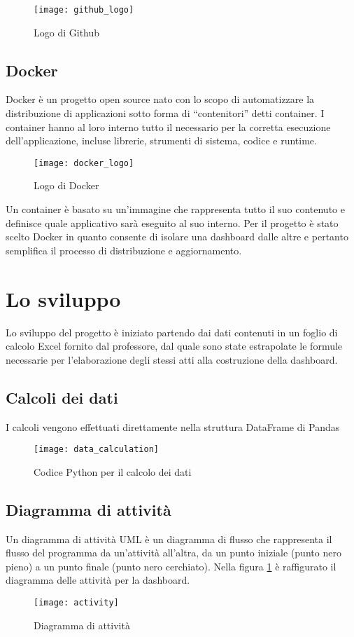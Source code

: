 \begin{figure}[htp]
    \centering
    \texttt{[image: github\_logo]}
    \caption{Logo di Github}
\end{figure}

\subsection{Docker}
\noindent Docker è un progetto open source nato con lo scopo di automatizzare la distribuzione di applicazioni sotto forma di “contenitori” detti container.
I container hanno al loro interno tutto il necessario per la corretta esecuzione dell’applicazione, incluse librerie, strumenti di sistema, codice e runtime.

\begin{figure}[htp]
    \centering
    \texttt{[image: docker\_logo]}
    \caption{Logo di Docker}
\end{figure}

\noindent Un container è basato su un’immagine che rappresenta tutto il suo contenuto e definisce quale applicativo sarà eseguito al suo interno. 
Per il progetto è stato scelto Docker in quanto consente di isolare una dashboard dalle altre e pertanto semplifica il processo di distribuzione e aggiornamento.

\section{Lo sviluppo}
Lo sviluppo del progetto è iniziato partendo dai dati contenuti in un foglio di calcolo Excel fornito dal professore, dal quale sono state estrapolate le formule necessarie per l’elaborazione degli stessi atti alla costruzione della dashboard.

\subsection{Calcoli dei dati}
I calcoli vengono effettuati direttamente nella struttura DataFrame di Pandas
\begin{figure}[htp]
    \centering
    \texttt{[image: data\_calculation]}
    \caption{Codice Python per il calcolo dei dati}
\end{figure}

\subsection{Diagramma di attività}
Un diagramma di attività UML è un diagramma di flusso che rappresenta il flusso del programma da un'attività all'altra, da un punto iniziale (punto nero pieno) a un punto finale (punto nero cerchiato).
Nella figura \ref{fig:activity} è raffigurato il diagramma delle attività per la dashboard.
\begin{figure}[htp]
    \centering
    \texttt{[image: activity]}
    \caption{Diagramma di attività}
    \label{fig:activity}
\end{figure}

